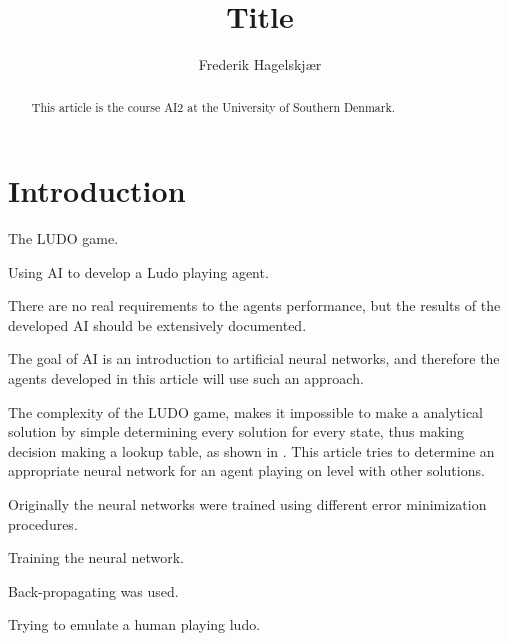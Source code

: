 \documentclass{llncs}
\begin{document}
\title{Title}
\author{Frederik Hagelskjær}
\maketitle

\begin{abstract}

This article is the course AI2 at the University of Southern Denmark. 

\end{abstract}

\section*{Introduction}

The LUDO game. 

Using AI to develop a Ludo playing agent. 

There are no real requirements to the agents performance, but the results of the developed AI should be extensively documented. 

The goal of AI is an introduction to artificial neural networks, and therefore the agents developed in this article will use such an approach.

The complexity of the LUDO game, makes it impossible to make a analytical solution by simple determining every solution for every state, thus making decision making a lookup table, as shown in \citep{6031999}. This article tries to determine an appropriate neural network for an agent playing on level with other solutions.

Originally the neural networks were trained using different error minimization procedures.

Training the neural network.

Back-propagating was used. 

Trying to emulate a human playing ludo.
\end{document}
